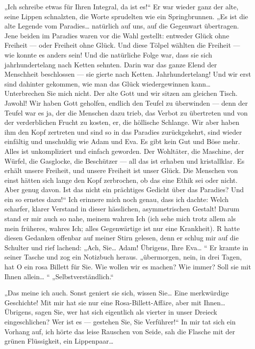„Ich schreibe etwas für Ihren Integral, da ist es!“ Er war wieder
ganz der alte, seine Lippen schnalzten, die Worte sprudelten wie
ein Springbrunnen. „Es ist die alte Legende vom Paradies\ldots{}
natürlich auf uns, auf die Gegenwart übertragen. Jene beiden im
Paradies waren vor die Wahl gestellt: entweder Glück ohne Freiheit
— oder Freiheit ohne Glück. Und diese Tölpel wählten die Freiheit —
wie konnte es anders sein! Und die natürliche Folge war, dass sie
sich jahrhundertelang nach Ketten sehnten. Darin war das ganze
Elend der Menschheit beschlossen — sie gierte nach Ketten.
Jahrhundertelang! Und wir erst sind dahinter gekommen, wie man das
Glück wiedergewinnen kann\ldots{} Unterbrechen Sie mich nicht. Der alte
Gott und wir sitzen am gleichen Tisch. Jawohl! Wir haben Gott
geholfen, endlich den Teufel zu überwinden — denn der Teufel war es
ja, der die Menschen dazu trieb, das Verbot zu übertreten und von
der verderblichen Frucht zu kosten, er, die höllische Schlange. Wir
aber haben ihm den Kopf zertreten und sind so in das Paradies
zurückgekehrt, sind wieder einfältig und unschuldig wie Adam und
Eva. Es gibt kein Gut und Böse mehr. Alles ist unkompliziert und
einfach geworden. Der Wohltäter, die Maschine, der Würfel, die
Gasglocke, die Beschützer — all das ist erhaben und kristallklar.
Es erhält unsere Freiheit, und unsere Freiheit ist unser Glück. Die
Menschen von einst hätten sich lange den Kopf zerbrochen, ob das
eine Ethik sei oder nicht. Aber genug davon. Ist das nicht ein
prächtiges Gedicht über das Paradies? Und ein so ernstes dazu!“ Ich
erinnere mich noch genau, dass ich dachte: Welch scharfer, klarer
Verstand in dieser hässlichen, asymmetrischen Gestalt! Darum stand
er mir auch so nahe, meinem wahren Ich (ich sehe mich trotz allem
als mein früheres, wahres Ich; alles Gegenwärtige ist nur eine
Krankheit). R hatte diesen Gedanken offenbar auf meiner Stirn
gelesen, denn er schlug mir auf die Schulter und rief lachend:
„Ach, Sie\ldots{} Adam! Übrigens, Ihre Eva\ldots{} “ Er kramte in seiner
Tasche und zog ein Notizbuch heraus. „übermorgen, nein, in drei
Tagen, hat O ein rosa Billett für Sie. Wie wollen wir es machen?
Wie immer? Soll sie mit Ihnen allein\ldots{} “ „Selbstverständlich.“

„Das meine ich auch. Sonst geniert sie sich, wissen Sie\ldots{} Eine
merkwürdige Geschichte! Mit mir hat sie nur eine
Rosa-Billett-Affäre, aber mit Ihnen\ldots{} Übrigens, sagen Sie, wer hat
sich eigentlich als vierter in unser Dreieck eingeschlichen? Wer
ist es — gestehen Sie, Sie Verführer!“ In mir tat sich ein Vorhang
auf, ich hörte das leise Rauschen von Seide, sah die Flasche mit
der grünen Flüssigkeit, ein Lippenpaar\ldots{}

